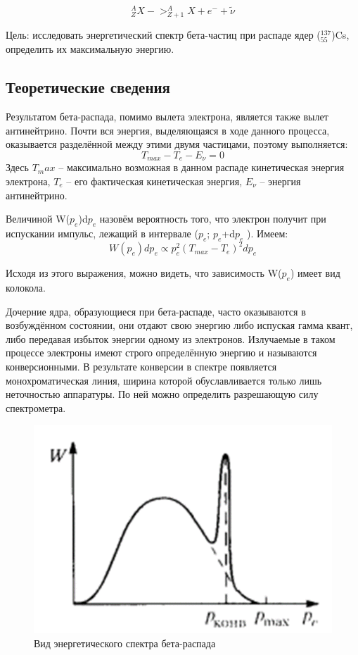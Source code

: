 \documentclass[12pt,a4paper]{article}
\begin{document}
\begin{equation}
^A_Z X -> ^A_{Z+1} X + e^- + \tilde{\nu}
\end{equation}	

Цель: исследовать энергетический спектр бета-частиц при распаде ядер ($_55^137$)Cs, определить их максимальную энергию.


\subsection{Теоретические сведения}
Результатом бета-распада, помимо вылета электрона, является также вылет антинейтрино. Почти вся энергия, выделяющаяся в ходе данного процесса, оказывается разделённой между этими двумя частицами, поэтому выполняется:
\begin{equation}
T_{max} - T_e - E_\nu=0
\end{equation}
Здесь $T_max$ – максимально возможная в данном распаде кинетическая энергия электрона, $T_e$ – его фактическая кинетическая энергия, $E_\nu$ – энергия антинейтрино.

	Величиной W($p_e$)d$p_e$ назовём вероятность того, что электрон получит при испускании импульс, лежащий в интервале ($p_e$; $p_e$+d$p_e$ ).
Имеем:
\begin{equation}
W(p_e)dp_e \varpropto p_e^2 (T_{max} - T_e )^2 dp_e
\end{equation}

	Исходя из этого выражения, можно видеть, что зависимость W($p_e$) имеет вид колокола.

	Дочерние ядра, образующиеся при бета-распаде, часто оказываются в возбуждённом состоянии, они отдают свою энергию либо испуская гамма квант, либо передавая избыток энергии одному из электронов. Излучаемые в таком процессе электроны имеют строго определённую энергию и называются конверсионными. В результате конверсии в спектре появляется монохроматическая линия, ширина которой обуславливается только лишь неточностью аппаратуры. По ней можно определить разрешающую силу спектрометра.

\begin{figure}[h]
\includegraphics[scale = 0.5]{5.4.2-1}
\centering
\caption{Вид энергетического спектра бета-распада}
\end{figure}
\end{document}
